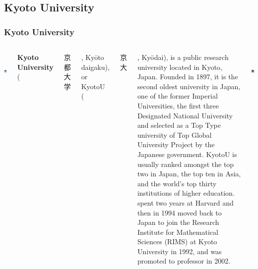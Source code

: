 \documentclass[9pt]{beamer}
\begin{document}
        \subsection{Kyoto University}
        \begin{frame}
            \frametitle{Kyoto University}
            \begin{columns}
                    \begin{centering}
                        \includegraphics[width=2cm,height=2cm]{images/uni.png}\\
                        \vspace{0.2cm}
                    \end{centering}
                    \justify
                    \textbf{Kyoto University} (\begin{CJK}{UTF8}{min}京都大学\end{CJK}, Kyōto daigaku), or KyotoU (\begin{CJK}{UTF8}{min}京大\end{CJK}, Kyōdai), is a public research university located in Kyoto, Japan. Founded in 1897, it is the second oldest university in Japan, one of the former Imperial Universities, the first three Designated National University and selected as a Top Type university of Top Global University Project by the Japanese government.
                    \justify
                    KyotoU is usually ranked amongst the top two in Japan, the top ten in Asia, and the world's top thirty institutions of higher education.\\\vspace{0.3cm}
                    \pause
                    \hyperlink{mochizuki}{} spent two years at Harvard and then in 1994 moved back to Japan to join the Research Institute for Mathematical Sciences (RIMS) at Kyoto University in 1992, and was promoted to professor in 2002.\\\vspace{0.3cm}
                    \begin{centering}
                        \includegraphics[width=1.8cm,height=2cm]{images/photo.jpg}\\
                    \end{centering}
            \end{columns}
        \end{frame}
        
\end{document}
